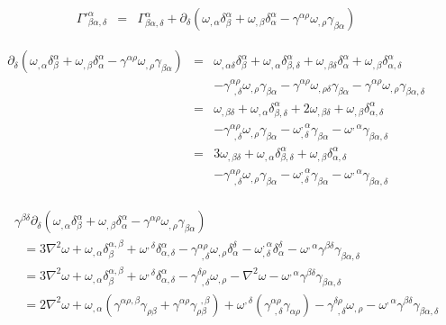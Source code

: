 \documentclass[aps,preprint,preprintnumbers,nofootinbib,showpacs,prd]{revtex4-1}
\newcommand{\nbea}{\begin{eqnarray*}}
\newcommand{\neea}{\end{eqnarray*}}
\begin{document}
%
\nbea
\Gamma'^\alpha_{\beta\alpha,\delta} & = & \Gamma^\alpha_{\beta\alpha,\delta} + \partial_\delta\left ( \omega_{,\alpha} \delta^\alpha_\beta + \omega_{,\beta}\delta^\alpha_\alpha - \gamma^{\alpha\rho}\omega_{,\rho} \gamma_{\beta\alpha} \right )
\neea
%

%
\nbea
\partial_\delta\left ( \omega_{,\alpha} \delta^\alpha_\beta + \omega_{,\beta}\delta^\alpha_\alpha - \gamma^{\alpha\rho}\omega_{,\rho} \gamma_{\beta\alpha} \right ) & = & \omega_{,\alpha\delta} \delta^\alpha_\beta + \omega_{,\alpha} \delta^\alpha_{\beta,\delta} + \omega_{,\beta\delta}\delta^\alpha_\alpha + \omega_{,\beta}\delta^\alpha_{\alpha,\delta} \\
& & - \gamma^{\alpha\rho}_{~~,\delta}\omega_{,\rho} \gamma_{\beta\alpha} - \gamma^{\alpha\rho}\omega_{,\rho\delta} \gamma_{\beta\alpha} - \gamma^{\alpha\rho}\omega_{,\rho} \gamma_{\beta\alpha,\delta} \\
& = & \omega_{,\beta\delta} + \omega_{,\alpha} \delta^\alpha_{\beta,\delta} + 2 \omega_{,\beta\delta} + \omega_{,\beta}\delta^\alpha_{\alpha,\delta} \\
& & - \gamma^{\alpha\rho}_{~~,\delta}\omega_{,\rho} \gamma_{\beta\alpha} - \omega^{,\alpha}_{,\delta} \gamma_{\beta\alpha} - \omega^{,\alpha} \gamma_{\beta\alpha,\delta} \\
& = & 3 \omega_{,\beta\delta} + \omega_{,\alpha} \delta^\alpha_{\beta,\delta} + \omega_{,\beta}\delta^\alpha_{\alpha,\delta} \\
& & - \gamma^{\alpha\rho}_{~~,\delta}\omega_{,\rho} \gamma_{\beta\alpha} - \omega^{,\alpha}_{,\delta} \gamma_{\beta\alpha} - \omega^{,\alpha} \gamma_{\beta\alpha,\delta} \\
\neea
%

%
\nbea
&& \gamma^{\beta\delta}\partial_\delta\left ( \omega_{,\alpha} \delta^\alpha_\beta + \omega_{,\beta}\delta^\alpha_\alpha - \gamma^{\alpha\rho}\omega_{,\rho} \gamma_{\beta\alpha} \right ) \\
&& ~~~ = 3 \nabla^2\omega + \omega_{,\alpha} \delta^{\alpha,\beta}_{\beta} + \omega^{,\delta}\delta^\alpha_{\alpha,\delta} - \gamma^{\alpha\rho}_{~~,\delta}\omega_{,\rho} \delta^{\delta}_{\alpha} - \omega^{,\alpha}_{,\delta} \delta^\delta_{\alpha} - \omega^{,\alpha} \gamma^{\beta\delta}\gamma_{\beta\alpha,\delta} \\
&& ~~~ = 3 \nabla^2\omega + \omega_{,\alpha} \delta^{\alpha,\beta}_{\beta} + \omega^{,\delta}\delta^\alpha_{\alpha,\delta} - \gamma^{\delta\rho}_{~~,\delta}\omega_{,\rho} - \nabla^2\omega - \omega^{,\alpha} \gamma^{\beta\delta}\gamma_{\beta\alpha,\delta} \\
&& ~~~ = 2 \nabla^2\omega + \omega_{,\alpha} (\gamma^{\alpha\rho,\beta}\gamma_{\rho\beta} + \gamma^{\alpha\rho}\gamma^{~~,\beta}_{\rho\beta}) + \omega^{,\delta}(\gamma^{\alpha\rho}_{~~,\delta} \gamma_{\alpha\rho}) - \gamma^{\delta\rho}_{~~,\delta}\omega_{,\rho} - \omega^{,\alpha} \gamma^{\beta\delta}\gamma_{\beta\alpha,\delta} \\
\neea
%
\end{document}
